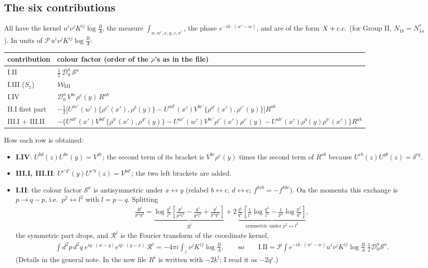\documentclass[10pt]{article}
\numberwithin{equation}{section}
\begin{document}
\subsection{The six contributions}
All have the kernel $u^{i}v^{j}K^{ij}\log\frac{B}{A}$, the measure $\int_{w,w',x,y,z,x'}$, the phase $e^{-ik\cdot(w'-w)}$, and are of the form $X+{\rm c.c.}$ (for Group II, $N_{1b}=N_{1a}^{*}$). In units of $\mathcal{P}\,u^{i}v^{j}K^{ij}\log\frac{B}{A}$:
\begin{center}
\renewcommand{\arraystretch}{1.3}
\begin{tabular}{p{2.6cm}|l}
contribution & colour factor (order of the $\rho$'s as in the file)\\ \hline
I.II & $\tfrac12\,\mathcal{D}_{0}^{a}\,\mathcal{S}^{a}$\\
I.III ($S_{1}$) & $\mathcal{W}_{\rm III}$\\
I.IV & $\mathcal{D}_{0}^{a}\,V^{be}\rho^{e}(y)\,R^{ab}$\\
II.I first part & $-\tfrac12\big[U^{ac'}(w')\{\rho^{c'}(x'),\rho^{b}(y)\}-U^{ad'}(x')V^{be'}\{\rho^{d'}(x'),\rho^{e'}(y)\}\big]R^{ab}$\\
III.I $+$ III.II & $-\big\{U^{ab'}(x')V^{bd'}\{\rho^{b'}(x'),\rho^{d'}(y)\}-U^{ac'}(w')V^{be'}\rho^{c'}(x')\rho^{e'}(y)-U^{ab'}(x')\rho^{b}(y)\rho^{b'}(x')\big\}R^{ab}$
\end{tabular}
\end{center}
How each row is obtained:
\begin{itemize}
\item \textbf{I.IV}: $U^{bd}(z)U^{be}(y)=V^{de}$; the second term of its bracket is $V^{be}\rho^{e}(y)$ times the second term of $R^{ab}$ because $U^{cb}(z)U^{gb}(z)=\delta^{cg}$.
\item \textbf{III.I, III.II}: $U^{c'd'}(y)U^{c'b}(z)=V^{bd'}$; the two left brackets are added.
\item \textbf{I.II}: the colour factor $\mathcal{S}^{a}$ is antisymmetric under $x\leftrightarrow y$ (relabel $b\leftrightarrow c$, $d\leftrightarrow e$; $f^{hcb}=-f^{hbc}$). On the momenta this exchange is $p\to q-p$, i.e.\ $p^{2}\leftrightarrow l^{2}$ with $l=p-q$. Splitting
\begin{align}
\frac{R^{i}}{p^{2}q^{2}}=\underbrace{\log\frac{q^{2}}{l^{2}}\left[\frac{p^{i}}{p^{2}l^{2}}-\frac{q^{i}}{q^{2}l^{2}}+\frac{q^{i}}{p^{2}q^{2}}\right]}_{\mathcal{R}^{i}}
+2\,\underbrace{\frac{q^{i}}{q^{2}}\left[\frac{1}{l^{2}}\log\frac{q^{2}}{l^{2}}-\frac{1}{p^{2}}\log\frac{p^{2}}{q^{2}}\right]}_{\text{symmetric under }p^{2}\leftrightarrow l^{2}},
\end{align}
the symmetric part drops, and $\mathcal{R}^{i}$ is the Fourier transform of the coordinate kernel,
\begin{align}
\int d^{2}p\,d^{2}q\;e^{iq\cdot(w-y)}e^{ip\cdot(y-x)}\,\mathcal{R}^{i}=-4\pi i\int_{z}v^{j}K^{ij}\log\frac{B}{A},
\qquad\text{so}\qquad
\text{I.II}=\mathcal{P}\int e^{-ik\cdot(w'-w)}u^{i}v^{j}K^{ij}\log\frac{B}{A}\;\tfrac12\mathcal{D}_{0}^{a}\mathcal{S}^{a}.
\end{align}
(Details in the general note. In the new file $R^{i}$ is written with $-2k^{i}$; I read it as $-2q^{i}$.)
\end{itemize}
\end{document}
